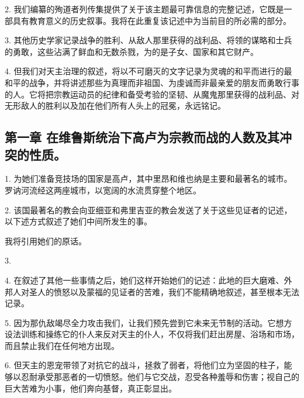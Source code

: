 2. 我们编纂的殉道者列传集提供了关于该主题最可靠信息的完整记述，它既是一部具有教育意义的历史叙事。我将在此重复该记述中为当前目的所必需的部分。\par

3. 其他历史学家记录战争的胜利、从敌人那里获得的战利品、将领的谋略和士兵的勇敢，这些沾满了鲜血和无数杀戮，为的是子女、国家和其它财产。\par

4. 但我们对天主治理的叙述，将以不可磨灭的文字记录为灵魂的和平而进行的最和平的战争，并将讲述那些为真理而非祖国、为虔诚而非最亲爱的朋友而勇敢行事的人。它将把宗教运动员的纪律和备受考验的坚韧、从魔鬼那里获得的战利品、对无形敌人的胜利以及加在他们所有人头上的冠冕，永远铭记。\par


\subsection{第一章 在维鲁斯统治下高卢为宗教而战的人数及其冲突的性质。}

1. 为她们准备竞技场的国家是高卢，其中里昂和维也纳是主要和最著名的城市。罗讷河流经这两座城市，以宽阔的水流贯穿整个地区。\par

2. 该国最著名的教会向亚细亚和弗里吉亚的教会发送了关于这些见证者的记述，以下述方式叙述了她们中间所发生的事。\par

我将引用她们的原话。\par

3. \par

4. 在叙述了其他一些事情之后，她们这样开始她们的记述：此地的巨大磨难、外邦人对圣人的愤怒以及蒙福的见证者的苦难，我们不能精确地叙述，甚至根本无法记录。\par

5. 因为那仇敌竭尽全力攻击我们，让我们预先尝到它未来无节制的活动。它想方设法训练和操练它的仆人来反对天主的仆人，不仅将我们赶出房屋、浴场和市场，而且禁止我们在任何地方出现。\par

6. 但天主的恩宠带领了对抗它的战斗，拯救了弱者，将他们立为坚固的柱子，能够以忍耐承受那恶者的一切愤怒。他们与它交战，忍受各种羞辱和伤害；视自己的巨大苦难为小事，他们奔向基督，真正彰显出。\par

